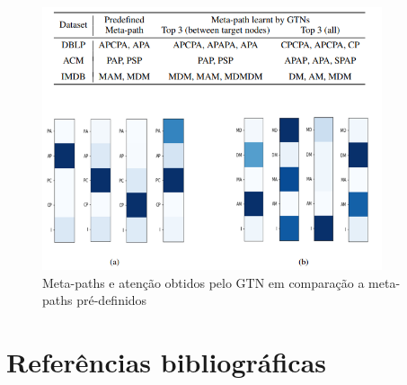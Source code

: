 \documentclass[12pt,notheorems,hyperref={pdfauthor=whatever}]{beamer}
\begin{document}
\begin{frame}
    \begin{figure}
        \centering
        \includegraphics[width=10cm]{img/attention.png}
        \caption{Meta-paths e atenção obtidos pelo GTN em comparação a meta-paths pré-definidos
        \cite{DBLP:journals/corr/abs-1911-06455}}
        \label{fig:attention}
    \end{figure}
    
\end{frame}



\section{Referências bibliográficas}
\begin{frame}
    \nocite{DBLP:journals/corr/abs-1911-06455}
    \nocite{YUN2022104}
    \nocite{cai_2021}
    
\end{frame}
\end{document}
